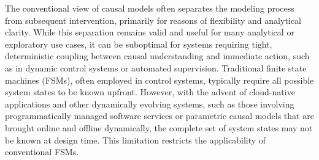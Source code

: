 The conventional view of causal models often separates the modeling process from subsequent intervention, primarily for reasons of flexibility and analytical clarity. While this separation remains valid and useful for many analytical or exploratory use cases, it can be suboptimal for systems requiring tight, deterministic coupling between causal understanding and immediate action, such as in dynamic control systems or automated supervision. Traditional finite state machines (FSMs), often employed in control systems, typically require all possible system states to be known upfront. However, with the advent of cloud-native applications and other dynamically evolving systems, such as those involving programmatically managed software services or parametric causal models that are brought online and offline dynamically, the complete set of system states may not be known at design time. This limitation restricts the applicability of conventional FSMs.


